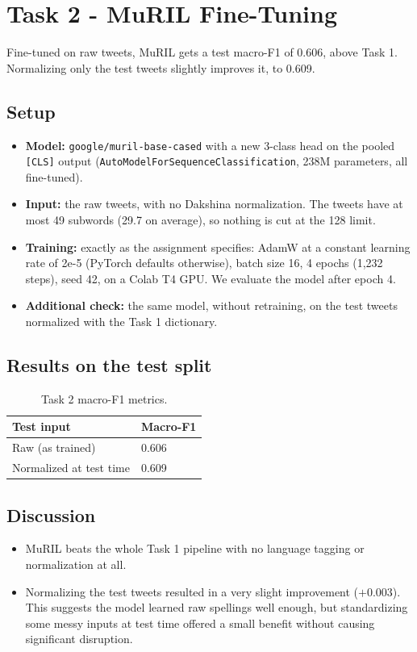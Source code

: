\section{Task 2 - MuRIL Fine-Tuning}

Fine-tuned on raw tweets, MuRIL gets a test macro-F1 of 0.606, above Task 1. Normalizing only the test tweets slightly improves it, to 0.609.

\subsection*{Setup}
\begin{itemize}
    \item \textbf{Model:} \texttt{google/muril-base-cased} with a new 3-class head on the pooled \texttt{[CLS]} output (\texttt{AutoModelForSequenceClassification}, 238M parameters, all fine-tuned).
    \item \textbf{Input:} the raw tweets, with no Dakshina normalization. The tweets have at most 49 subwords (29.7 on average), so nothing is cut at the 128 limit.
    \item \textbf{Training:} exactly as the assignment specifies: AdamW at a constant learning rate of 2e-5 (PyTorch defaults otherwise), batch size 16, 4 epochs (1,232 steps), seed 42, on a Colab T4 GPU. We evaluate the model after epoch 4.
    \item \textbf{Additional check:} the same model, without retraining, on the test tweets normalized with the Task 1 dictionary.
\end{itemize}

\subsection*{Results on the test split}
\begin{table}[H]
    \centering
    \begin{tabular}{@{}ll@{}}
        \toprule
        \textbf{Test input} & \textbf{Macro-F1} \\
        \midrule
        Raw (as trained) & 0.606 \\
        Normalized at test time & 0.609 \\
        \bottomrule
    \end{tabular}
    \caption{Task 2 macro-F1 metrics.}
    \label{tab:task2_results}
\end{table}

\subsection*{Discussion}
\begin{itemize}
    \item MuRIL beats the whole Task 1 pipeline with no language tagging or normalization at all.
    \item Normalizing the test tweets resulted in a very slight improvement ($+0.003$). This suggests the model learned raw spellings well enough, but standardizing some messy inputs at test time offered a small benefit without causing significant disruption.
\end{itemize}
